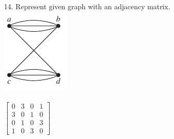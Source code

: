 \begin{itemize}
      \item[14.] Represent given graph with an adjacency matrix. \\
            \includegraphics[scale = 0.7]{img/10_3_14_graph.png}\\
            \answer \vspace{1.5mm} \\
            $
                  \begin{bmatrix}
                        0 & 3 & 0 & 1 \\
                        3 & 0 & 1 & 0 \\
                        0 & 1 & 0 & 3 \\
                        1 & 0 & 3 & 0
                  \end{bmatrix}
            $


\end{itemize}
